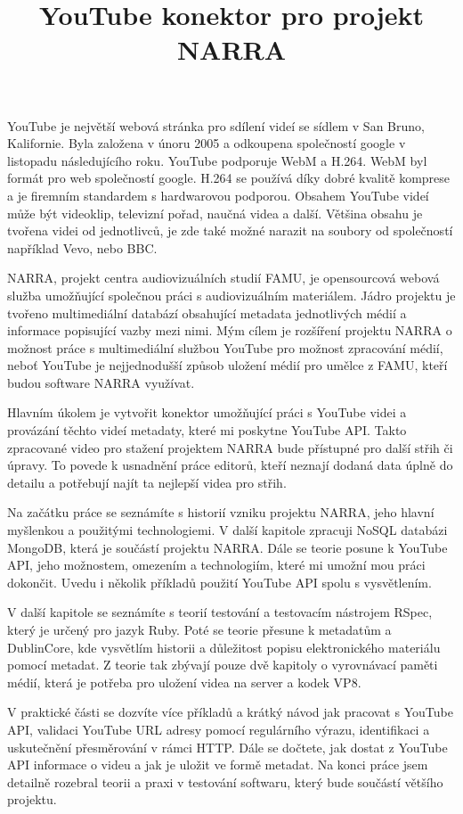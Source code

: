\documentclass[thesis=B,czech]{FITthesis}[2012/06/26]
\title{YouTube konektor pro projekt NARRA}
\begin{document}

\begin{introduction}
\par YouTube\cite{yout} je největší webová stránka pro sdílení videí se sídlem v San Bruno, Kalifornie. Byla založena v únoru 2005 a odkoupena společností google v listopadu následujícího roku. YouTube podporuje WebM a H.264. WebM byl formát pro web společností google. H.264 se používá díky dobré kvalitě komprese a je firemním standardem s hardwarovou podporou. Obsahem YouTube videí může být videoklip, televizní pořad, naučná videa a další. Většina obsahu je tvořena videi od jednotlivců, je zde také možné narazit na soubory od společností například Vevo, nebo BBC.
\par NARRA, projekt centra audiovizuálních studií FAMU, je opensourcová webová služba umožňující společnou práci s audiovizuálním materiálem. Jádro projektu je tvořeno multimediální databází obsahující metadata jednotlivých médií a informace popisující vazby mezi nimi. Mým cílem je rozšíření projektu NARRA o možnost práce s multimediální službou YouTube pro možnost zpracování médií, neboť YouTube je nejjednodušší způsob uložení médií pro umělce z FAMU, kteří budou software NARRA využívat.
\par Hlavním úkolem je vytvořit konektor umožňující práci s YouTube videi a provázání těchto videí metadaty, které mi poskytne YouTube API. Takto zpracované video pro stažení projektem NARRA bude přístupné pro další střih či úpravy. To povede k usnadnění práce editorů, kteří neznají dodaná data úplně do detailu a potřebují najít ta nejlepší videa pro střih. 
\par Na začátku práce se seznámíte s historií vzniku projektu NARRA, jeho hlavní myšlenkou a použitými technologiemi. V další kapitole zpracuji NoSQL databázi MongoDB, která je součástí projektu NARRA. Dále se teorie posune k YouTube API, jeho možnostem, omezením a technologiím, které mi umožní mou práci dokončit. Uvedu i několik příkladů použití YouTube API spolu s vysvětlením.
\par V další kapitole se seznámíte s teorií testování a testovacím nástrojem RSpec, který je určený pro jazyk Ruby. Poté se teorie přesune k metadatům a DublinCore, kde vysvětlím historii a důležitost popisu elektronického materiálu pomocí metadat. Z teorie tak zbývají pouze dvě kapitoly o vyrovnávací paměti médií, která je potřeba pro uložení videa na server a kodek VP8.
\par V praktické části se dozvíte více příkladů a krátký návod jak pracovat s YouTube API, validaci YouTube URL adresy pomocí regulárního výrazu, identifikaci a uskutečnění přesměrování v rámci HTTP. Dále se dočtete, jak dostat z YouTube API informace o videu a jak je uložit ve formě metadat. Na konci práce jsem detailně rozebral teorii a praxi v testování softwaru, který bude součástí většího projektu.
\end{introduction}
\end{document}
